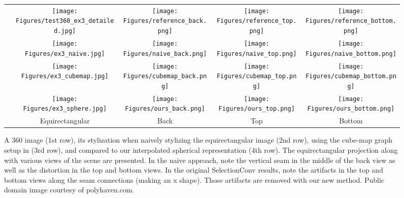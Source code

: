 \documentclass[10pt,twocolumn,letterpaper]{article}
\begin{document}
\begin{figure*}
\begin{center}
\begin{tabular}{rcccc}
\raisebox{0.075\linewidth}{\rotatebox[origin=c]{90}{Spherical Image}} &
\texttt{[image: Figures/test360\_ex3\_detailed.jpg]} &
\texttt{[image: Figures/reference\_back.png]} &
\texttt{[image: Figures/reference\_top.png]} &
\texttt{[image: Figures/reference\_bottom.png]}
\\
\raisebox{0.075\linewidth}{\rotatebox[origin=c]{90}{Naive}} &
\texttt{[image: Figures/ex3\_naive.jpg]} &
\texttt{[image: Figures/naive\_back.png]} &
\texttt{[image: Figures/naive\_top.png]} &
\texttt{[image: Figures/naive\_bottom.png]}
\\ 
\raisebox{0.075\linewidth}{\rotatebox[origin=c]{90}{SelectionConv~\cite{SelectionConv}}} &
\texttt{[image: Figures/ex3\_cubemap.jpg]} &
\texttt{[image: Figures/cubemap\_back.png]} &
\texttt{[image: Figures/cubemap\_top.png]} &
\texttt{[image: Figures/cubemap\_bottom.png]}
\\ 
\raisebox{0.075\linewidth}{\rotatebox[origin=c]{90}{Ours}} &
\texttt{[image: Figures/ex3\_sphere.jpg]} &
\texttt{[image: Figures/ours\_back.png]} &
\texttt{[image: Figures/ours\_top.png]} &
\texttt{[image: Figures/ours\_bottom.png]} 
\\
&
Equirectangular &
Back &
Top &
Bottom
\end{tabular}
\end{center}
    \caption{A 
    360 image
(1st row), its stylization when naively stylizing the equirectangular image (2nd row), using the cube-map graph setup in \cite{SelectionConv} (3rd row), and compared to our interpolated spherical representation (4th row). The equirectangular projection along with various views of the scene are presented. In the naive approach, note the vertical seam in the middle of the back view as well as the distortion in the top and bottom views. In the original SelectionConv results, note the artifacts in the top and bottom views along the seam connections (making an x shape). Those artifacts are removed with our new method. Public domain image courtesy of polyhaven.com.
    }
\label{fig:spherestyle}
\end{figure*}
\end{document}
